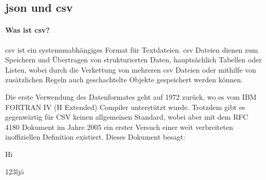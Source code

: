 \subsection{\acs{json} und \acs{csv}}
\paragraph{Was ist \acs{csv}?}
\acf{csv} ist ein systemunabhängiges Format für Textdateien. \acs{csv} Dateien dienen zum Speichern und Übertragen von strukturierten Daten, hauptsächlich Tabellen oder Listen, wobei durch die Verkettung von mehreren \acs{csv} Dateien oder mithilfe von zusätzlichen Regeln auch geschachtelte Objekte gespeichert werden können. \cite{FuchsMediaSolutions:o.J.}

Die erste Verwendung des Datenformates geht auf 1972 zurück, wo es vom IBM FORTRAN IV (H Extended) Compiler unterstützt wurde. Trotzdem gibt es gegenwärtig für CSV keinen allgemeinen Standard, wobei aber mit dem RFC 4180 Dokument \cite{Shafranovich:2005} im Jahre 2005 ein erster Versuch einer weit verbreiteten inoffiziellen Definition existiert. Dieses Dokument besagt:
\begin{list}{}{}
	\item Hi
	\item 123ljö
\end{list}
